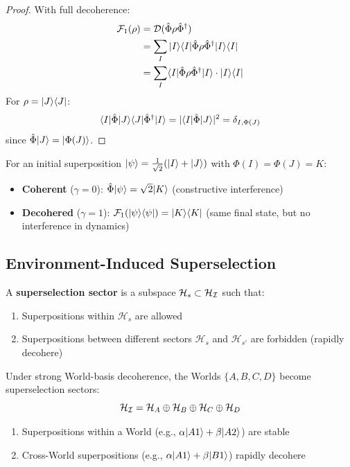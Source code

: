 \begin{proof}
With full decoherence:
\begin{align*}
\mathcal{F}_1(\rho) &= \mathcal{D}(\hat{\Phi} \rho \hat{\Phi}^\dagger) \\
&= \sum_I |I\rangle\langle I| \hat{\Phi} \rho \hat{\Phi}^\dagger |I\rangle\langle I| \\
&= \sum_I \langle I|\hat{\Phi} \rho \hat{\Phi}^\dagger|I\rangle \cdot |I\rangle\langle I|
\end{align*}
For $\rho = |J\rangle\langle J|$:
\[
\langle I|\hat{\Phi}|J\rangle\langle J|\hat{\Phi}^\dagger|I\rangle = |\langle I|\hat{\Phi}|J\rangle|^2 = \delta_{I, \Phi(J)}
\]
since $\hat{\Phi}|J\rangle = |\Phi(J)\rangle$.
\end{proof}

\begin{corollary}
\label{cor:decoherence-interference}
For an initial superposition $|\psi\rangle = \frac{1}{\sqrt{2}}(|I\rangle + |J\rangle)$ with $\Phi(I) = \Phi(J) = K$:
\begin{itemize}
  \item \textbf{Coherent} ($\gamma = 0$): $\hat{\Phi}|\psi\rangle = \sqrt{2}|K\rangle$ (constructive interference)
  \item \textbf{Decohered} ($\gamma = 1$): $\mathcal{F}_1(|\psi\rangle\langle \psi|) = |K\rangle\langle K|$ (same final state, but no interference in dynamics)
\end{itemize}
\end{corollary}

\subsection{Environment-Induced Superselection}

\begin{definition}
\label{def:superselection}
A \textbf{superselection sector} is a subspace $\mathcal{H}_s \subset \mathcal{H}_{\mathcal{I}}$ such that:
\begin{enumerate}
  \item Superpositions within $\mathcal{H}_s$ are allowed
  \item Superpositions between different sectors $\mathcal{H}_s$ and $\mathcal{H}_{s'}$ are forbidden (rapidly decohere)
\end{enumerate}
\end{definition}

\begin{theorem}
\label{thm:world-superselection}
Under strong World-basis decoherence, the Worlds $\{A, B, C, D\}$ become superselection sectors:
\[
\mathcal{H}_{\mathcal{I}} = \mathcal{H}_A \oplus \mathcal{H}_B \oplus \mathcal{H}_C \oplus \mathcal{H}_D
\]
\begin{enumerate}
  \item Superpositions within a World (e.g., $\alpha|A1\rangle + \beta|A2\rangle$) are stable
  \item Cross-World superpositions (e.g., $\alpha|A1\rangle + \beta|B1\rangle$) rapidly decohere
\end{enumerate}
\end{theorem}

